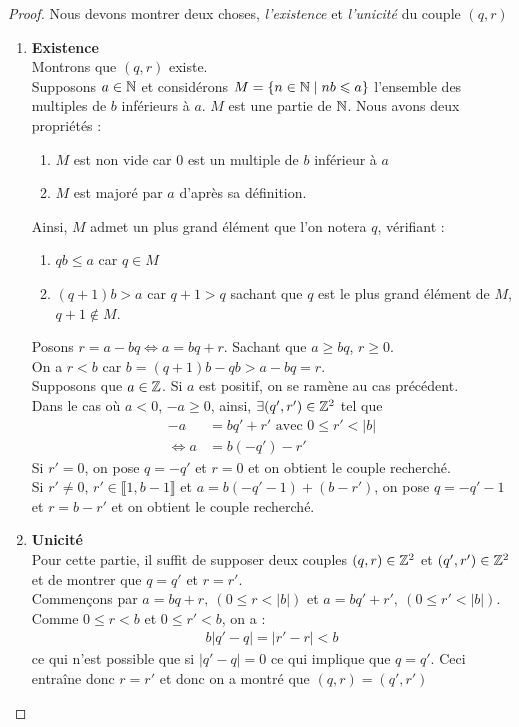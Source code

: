 \begin{proof}\cite{livre_prepa}
Nous devons montrer deux choses, \textit{l'existence} et \textit{l'unicité} du couple $(q, r)$
\begin{enumerate}
\item \textbf{Existence} 
\\
Montrons que $(q, r)$ existe.
\\
Supposons $a \in \mathbb{N}$ et considérons $M = \left\{ n \in \mathbb{N} \mid nb \leqslant a \right\}$ l'ensemble des multiples de $b$ inférieurs à $a$. $M$ est une partie de $\mathbb{N}$.
Nous avons deux propriétés :
\begin{enumerate}
\item $M$ est non vide car $0$ est un multiple de $b$ inférieur à $a$
\item $M$ est majoré par $a$ d'après sa définition.
\end{enumerate}
Ainsi, $M$ admet un plus grand élément que l'on notera $q$, vérifiant :
\begin{enumerate}
\item $qb \leq a$ car $q \in M$
\item $(q+1) b > a$ car $q + 1 > q$ sachant que $q$ est le plus grand élément de $M$, $q + 1 \notin M$.
\end{enumerate}
Posons $r = a - bq \Longleftrightarrow a = bq + r$.
Sachant que $a \geq bq$, $r \geq 0$. 
\\
On a $r < b$ car $b = (q+1)b - qb > a - bq = r$.
\\
Supposons que $a \in \mathbb{Z}$. Si $a$ est positif, on se ramène au cas précédent.
\\
Dans le cas où $a < 0$, $-a \geq 0$, ainsi, $\exists (q', r') \in \mathbb{Z}^2$ tel que 
\begin{align*}
-a &= bq' + r' \text{ avec } 0 \leq r' < |b| \\
\iff a &= b(-q') -r'
\end{align*}
Si $r' = 0$, on pose $q = -q'$ et $r = 0$ et on obtient le couple recherché. 
\\
Si $r' \neq 0$, $r' \in \llbracket 1, b - 1 \rrbracket$  et $a = b(-q' - 1) + (b - r')$, on pose $q = -q' - 1$ et $r = b - r'$ et on obtient le couple recherché.
\item \textbf{Unicité} \\
Pour cette partie, il suffit de supposer deux couples $(q, r) \in \mathbb{Z}^2$ et $(q', r') \in \mathbb{Z}^2$ et de montrer que $q = q'$ et $r = r'$.
\\
Commençons par $a = bq + r,\ (0 \leq r < |b|)$ et $a = bq' + r',\ (0 \leq r' < |b|)$. Comme $0 \leq r < b$ et $0 \leq r' < b$, on a : 
\begin{align*}
b|q' - q| = |r' - r| < b
\end{align*}
ce qui n'est possible que si $|q' - q| = 0$ ce qui implique que $q = q'$. Ceci entraîne donc $r = r'$ et donc on a montré que $(q, r) = (q', r')$
\end{enumerate}
\end{proof}

